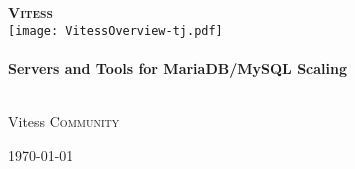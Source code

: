 \begin{titlepage}
 
\begin{center}

\textsc{\huge \bfseries Vitess}
\\[2.5cm] 
\texttt{[image: VitessOverview-tj.pdf]}\\[1cm]

\HRule \\[0.4cm]
{ \large  \bfseries Servers and Tools for MariaDB/MySQL Scaling}
\\[1.0cm]
 
\HRule \\[4.5cm]
 
\begin{minipage}{0.4\textwidth}
\begin{center} \large
Vitess \textsc{Community}
\end{center}
\end{minipage}
 
\vfill
{\large \today}
 
\end{center}
 
\end{titlepage}

